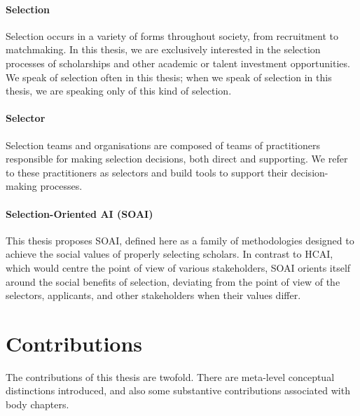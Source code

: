 
\paragraph{Selection}
Selection occurs in a variety of forms throughout society, from recruitment to matchmaking. In this thesis, we are exclusively interested in the selection processes of scholarships and other academic or talent investment opportunities. We speak of selection often in this thesis; when we speak of selection in this thesis, we are speaking only of this kind of selection.

\paragraph{Selector}
Selection teams and organisations are composed of teams of practitioners responsible for making selection decisions, both direct and supporting. We refer to these practitioners as selectors and build tools to support their decision-making processes.

\paragraph{Selection-Oriented AI (SOAI)} 
This thesis proposes SOAI, defined here as a family of methodologies designed to achieve the social values of properly selecting scholars. In contrast to HCAI, which would centre the point of view of various stakeholders, SOAI orients itself around the social benefits of selection, deviating from the point of view of the selectors, applicants, and other stakeholders when their values differ.


\section{Contributions} 
The contributions of this thesis are twofold. There are meta-level conceptual distinctions introduced, and also some substantive contributions associated with body chapters.

